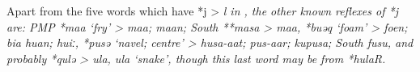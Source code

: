 Apart from the five words which have *j > \it{l} in , the other known reflexes of *j are: PMP *maa ‘fry’ > 
\it{maa};  \it{maan}; South  **masa
> \it{maa}, *buəq ‘foam’ >  \it{foen};  \it{bia huan};  \it{huiː},
*pusə ‘navel; centre’ >  \it{husa-aat};
  \it{pus-aar};  \it{kupusa};
South  \it{fusu}, and probably *qulə >  \it{ula}, 
\it{ula} ‘snake’, though this last word may be from *hulaR.
